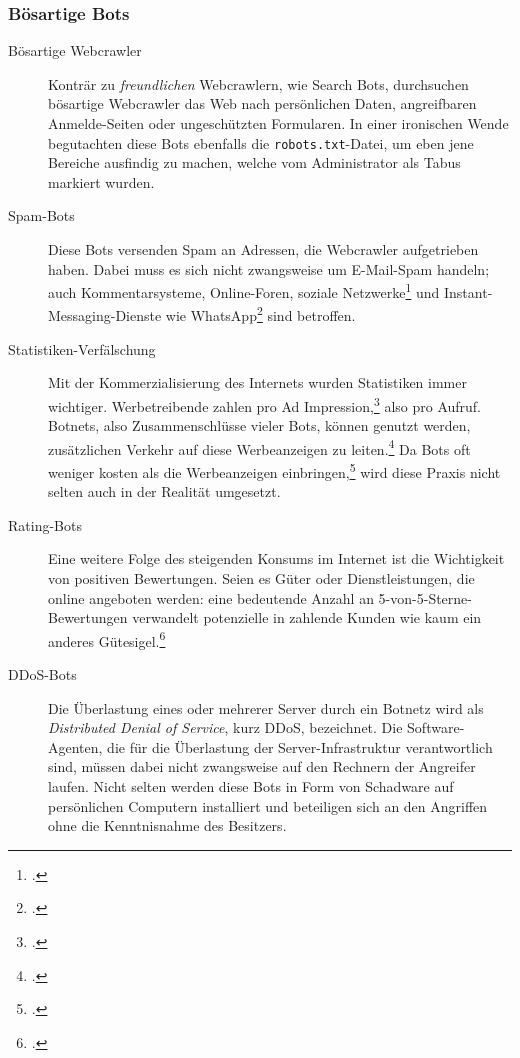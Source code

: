 \subsubsection{Bösartige Bots}
\label{ssub:boesartige-bots}

\begin{description}
  \item[Bösartige Webcrawler]
  Konträr zu \emph{freundlichen} Webcrawlern, wie Search Bots, durchsuchen
  bösartige Webcrawler das Web nach persönlichen Daten, angreifbaren
  Anmelde-Seiten oder ungeschützten Formularen. In einer ironischen Wende
  begutachten diese Bots ebenfalls die \texttt{robots.txt}-Datei, um eben jene
  Bereiche ausfindig zu machen, welche vom Administrator als Tabus markiert
  wurden.
  
  \item[Spam-Bots]
  Diese Bots versenden Spam an Adressen, die Webcrawler aufgetrieben haben.
  Dabei muss es sich nicht zwangsweise um E-Mail-Spam handeln; auch
  Kommentarsysteme, Online-Foren, soziale Netzwerke\footcite{facebookSpamBiz}
  und Instant-Messaging-Dienste wie WhatsApp\footcite{whatsappSpamSperre} sind
  betroffen.
  
  \item[Statistiken-Verfälschung]
  Mit der Kommerzialisierung des Internets wurden Statistiken immer wichtiger.
  Werbetreibende zahlen pro Ad Impression,\footcite{wp:adImpression} also pro
  Aufruf. Botnets, also Zusammenschlüsse vieler Bots, können genutzt werden,
  zusätzlichen Verkehr auf diese Werbeanzeigen zu
  leiten.\footcite{fakeTrafficPayday} Da Bots oft weniger kosten als die
  Werbeanzeigen einbringen,\footcite{fakeTrafficPayday} wird diese Praxis nicht
  selten auch in der Realität umgesetzt.
  
  \item[Rating-Bots]
  Eine weitere Folge des steigenden Konsums im Internet ist die Wichtigkeit von
  positiven Bewertungen. Seien es Güter oder Dienstleistungen, die online
  angeboten werden: eine bedeutende Anzahl an 5-von-5-Sterne-Bewertungen
  verwandelt potenzielle in zahlende Kunden wie kaum ein anderes
  Gütesigel.\footcite{consumersInfluencedReviews}
  
  \item[DDoS-Bots]
  Die Überlastung eines oder mehrerer Server durch ein Botnetz wird als
  \emph{Distributed Denial of Service}, kurz DDoS, bezeichnet. Die
  Software-Agenten, die für die Überlastung der Server-Infrastruktur
  verantwortlich sind, müssen dabei nicht zwangsweise auf den Rechnern der
  Angreifer laufen. Nicht selten werden diese Bots in Form von Schadware auf
  persönlichen Computern installiert und beteiligen sich an den Angriffen ohne
  die Kenntnisnahme des Besitzers.
\end{description}
